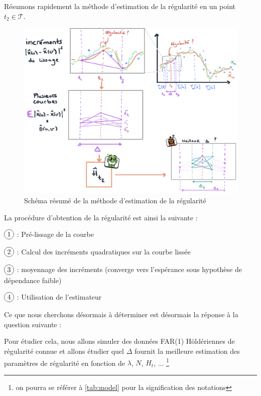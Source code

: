 Résumons rapidement la méthode d'estimation de la régularité en un point $t_2 \in \mathcal T$.

\begin{figure}[H]
	\begin{center}
		\includegraphics[width=\textwidth]{Images/sketches/estim_reg.jpg}
	\end{center}

	\caption{Schéma résumé de la méthode d'estimation de la régularité}
	\label{fig:sketch_estim_reg_methodo}
\end{figure}

La procédure d'obtention de la régularité est ainsi la suivante :

$\circled 1$ : Pré-lissage de la courbe

$\circled 2$ : Calcul des incréments quadratiques sur la courbe lissée

$\circled 3$ : moyennage des incréments (converge vers l'espérance sous hypothèse de dépendance faible)

$\circled 4$ : Utilisation de l'estimateur

Ce que nous cherchons désormais à déterminer est désormais la réponse à la question suivante :


Pour étudier cela, nous allons simuler des données FAR(1) Höldériennes de régularité connue et allons étudier quel $\Delta$ fournit la meilleure estimation des paramètres de régularité en fonction de $\lambda$, $N$, $H_t$, ... \footnote{on pourra se référer à \ref{tab:model} pour la signification des notations}
